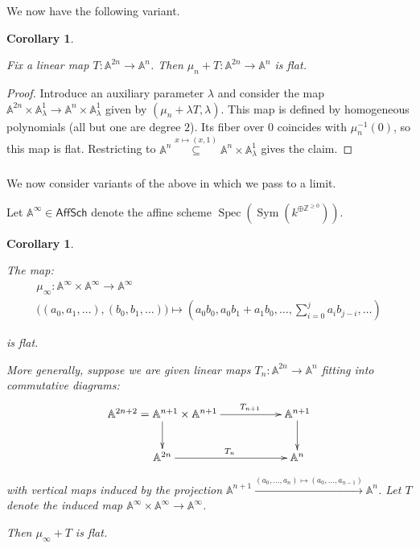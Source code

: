 \documentclass[reqno,11pt]{amsart}
\numberwithin{equation}{subsection}
\newtheorem{cor}[thm]{Corollary}
\theoremstyle{remark}
\newcommand{\xar}[1]{\xrightarrow{#1}}
\newcommand{\bA}{{\mathbb A}}
\newcommand{\bZ}{{\mathbb Z}}
\newcommand{\on}{\operatorname}
\newcommand{\Spec}{\on{Spec}}
\newcommand{\Sym}{\on{Sym}}
\newcommand{\AffSch}{\mathsf{AffSch}}
\renewcommand{\subset}{\subseteq}
\begin{document}
We now have the following variant.

\begin{cor}\label{c:flat-d}

Fix a linear map $T:\bA^{2n} \to \bA^n$.
Then $\mu_n+T:\bA^{2n} \to \bA^n$ is flat.

\end{cor}

\begin{proof}

Introduce an auxiliary parameter $\lambda$ and
consider the map $\bA^{2n} \times \bA_{\lambda}^1 \to 
\bA^n \times \bA_{\lambda}^1$ given by
$(\mu_n+\lambda T,\lambda)$. This map is defined by 
homogeneous polynomials (all but one are degree $2$). 
Its fiber over $0$ coincides with $\mu_n^{-1}(0)$, so this
map is flat. 
Restricting to 
$\bA^n \overset{x\mapsto (x,1)}{\subset} \bA^n \times \bA_{\lambda}^1$
gives the claim.

\end{proof}

\subsubsection{}

We now consider variants of the above in which
we pass to a limit.

Let $\bA^{\infty} \in \AffSch$ denote the affine scheme
$\Spec(\Sym(k^{\oplus \bZ^{\geq 0}}))$.  

\begin{cor}\label{c:flat-mult-infty}

The map:
%
\[
\begin{gathered}
\mu_{\infty}:\bA^{\infty} \times \bA^{\infty} \to \bA^{\infty} 
\\
\big((a_0,a_1,\ldots),(b_0,b_1,\ldots)\big) \mapsto 
(a_0b_0,a_0b_1+a_1b_0,\ldots,\sum_{i = 0}^{j} a_ib_{j-i},\ldots)
\end{gathered}
\]

\noindent is flat.

More generally, suppose we are given linear maps
$T_n:\bA^{2n} \to \bA^n$ fitting into commutative diagrams:
%
\[
\xymatrix{
\bA^{2n+2} = \bA^{n+1} \times \bA^{n+1} \ar[d] \ar[rr]^(.65){T_{n+1}} & &
\bA^{n+1} \ar[d] \\
\bA^{2n} \ar[rr]^{T_n} & & \bA^n
}
\]

\noindent with vertical maps induced by the projection
$\bA^{n+1} \xar{(a_0,\ldots,a_n) \mapsto (a_0,\ldots,a_{n-1})} \bA^n$.
Let $T$ denote the induced map 
$\bA^{\infty} \times \bA^{\infty} \to \bA^{\infty}$.

Then $\mu_{\infty}+T$ is flat.

\end{cor}
\end{document}
